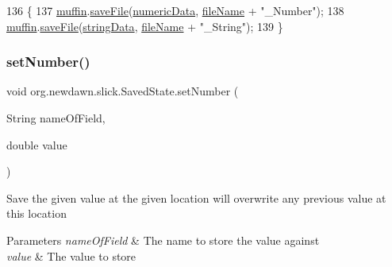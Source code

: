\begin{DoxyCode}
136                                           \{
137         \mbox{\hyperlink{classorg_1_1newdawn_1_1slick_1_1_saved_state_a461d13c1acfff7fbc631724ff5fae6a1}{muffin}}.\mbox{\hyperlink{interfaceorg_1_1newdawn_1_1slick_1_1muffin_1_1_muffin_a025189130fb123bc751e58677435974a}{saveFile}}(\mbox{\hyperlink{classorg_1_1newdawn_1_1slick_1_1_saved_state_ad734be75c78cdbd06ed020c7d416e187}{numericData}}, \mbox{\hyperlink{classorg_1_1newdawn_1_1slick_1_1_saved_state_ace5c7436bfdba5164f2b1826bb173388}{fileName}} + \textcolor{stringliteral}{"\_Number"});
138         \mbox{\hyperlink{classorg_1_1newdawn_1_1slick_1_1_saved_state_a461d13c1acfff7fbc631724ff5fae6a1}{muffin}}.\mbox{\hyperlink{interfaceorg_1_1newdawn_1_1slick_1_1muffin_1_1_muffin_a025189130fb123bc751e58677435974a}{saveFile}}(\mbox{\hyperlink{classorg_1_1newdawn_1_1slick_1_1_saved_state_a5c7e1053721ddfee0b4a2a29facd103b}{stringData}}, \mbox{\hyperlink{classorg_1_1newdawn_1_1slick_1_1_saved_state_ace5c7436bfdba5164f2b1826bb173388}{fileName}} + \textcolor{stringliteral}{"\_String"});
139     \}
\end{DoxyCode}
\mbox{\label{classorg_1_1newdawn_1_1slick_1_1_saved_state_ab0249cdc735869ea0fe006e0004021d5}} 
\subsubsection{\texorpdfstring{set\+Number()}{setNumber()}}
{\footnotesize\ttfamily void org.\+newdawn.\+slick.\+Saved\+State.\+set\+Number (\begin{DoxyParamCaption}\item[{String}]{name\+Of\+Field,  }\item[{double}]{value }\end{DoxyParamCaption})\hspace{0.3cm}{\ttfamily [inline]}}

Save the given value at the given location will overwrite any previous value at this location


\begin{DoxyParams}{Parameters}
{\em name\+Of\+Field} & The name to store the value against \\
\hline
{\em value} & The value to store \\
\hline
\end{DoxyParams}

